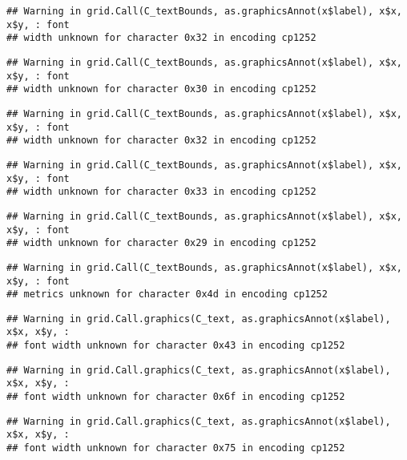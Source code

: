 \documentclass[
]{article}
\begin{document}
\begin{verbatim}
## Warning in grid.Call(C_textBounds, as.graphicsAnnot(x$label), x$x, x$y, : font
## width unknown for character 0x32 in encoding cp1252
\end{verbatim}

\begin{verbatim}
## Warning in grid.Call(C_textBounds, as.graphicsAnnot(x$label), x$x, x$y, : font
## width unknown for character 0x30 in encoding cp1252
\end{verbatim}

\begin{verbatim}
## Warning in grid.Call(C_textBounds, as.graphicsAnnot(x$label), x$x, x$y, : font
## width unknown for character 0x32 in encoding cp1252
\end{verbatim}

\begin{verbatim}
## Warning in grid.Call(C_textBounds, as.graphicsAnnot(x$label), x$x, x$y, : font
## width unknown for character 0x33 in encoding cp1252
\end{verbatim}

\begin{verbatim}
## Warning in grid.Call(C_textBounds, as.graphicsAnnot(x$label), x$x, x$y, : font
## width unknown for character 0x29 in encoding cp1252
\end{verbatim}

\begin{verbatim}
## Warning in grid.Call(C_textBounds, as.graphicsAnnot(x$label), x$x, x$y, : font
## metrics unknown for character 0x4d in encoding cp1252
\end{verbatim}

\begin{verbatim}
## Warning in grid.Call.graphics(C_text, as.graphicsAnnot(x$label), x$x, x$y, :
## font width unknown for character 0x43 in encoding cp1252
\end{verbatim}

\begin{verbatim}
## Warning in grid.Call.graphics(C_text, as.graphicsAnnot(x$label), x$x, x$y, :
## font width unknown for character 0x6f in encoding cp1252
\end{verbatim}

\begin{verbatim}
## Warning in grid.Call.graphics(C_text, as.graphicsAnnot(x$label), x$x, x$y, :
## font width unknown for character 0x75 in encoding cp1252
\end{verbatim}
\end{document}
